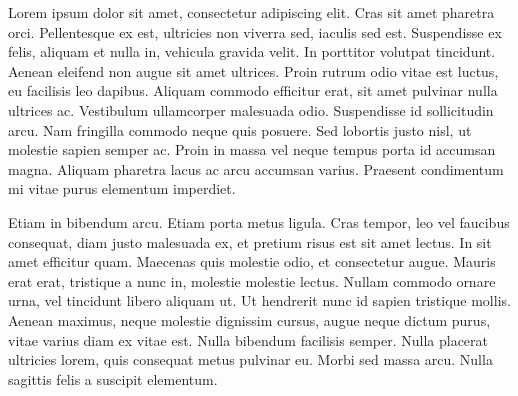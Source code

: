 \documentclass{hitreport}
\begin{document}
Lorem ipsum dolor sit amet, consectetur adipiscing elit. Cras sit amet pharetra orci. Pellentesque ex est, ultricies non viverra sed, iaculis sed est. Suspendisse ex felis, aliquam et nulla in, vehicula gravida velit. In porttitor volutpat tincidunt. Aenean eleifend non augue sit amet ultrices. Proin rutrum odio vitae est luctus, eu facilisis leo dapibus. Aliquam commodo efficitur erat, sit amet pulvinar nulla ultrices ac. Vestibulum ullamcorper malesuada odio. Suspendisse id sollicitudin arcu. Nam fringilla commodo neque quis posuere. Sed lobortis justo nisl, ut molestie sapien semper ac. Proin in massa vel neque tempus porta id accumsan magna. Aliquam pharetra lacus ac arcu accumsan varius. Praesent condimentum mi vitae purus elementum imperdiet.

Etiam in bibendum arcu. Etiam porta metus ligula. Cras tempor, leo vel faucibus consequat, diam justo malesuada ex, et pretium risus est sit amet lectus. In sit amet efficitur quam. Maecenas quis molestie odio, et consectetur augue. Mauris erat erat, tristique a nunc in, molestie molestie lectus. Nullam commodo ornare urna, vel tincidunt libero aliquam ut. Ut hendrerit nunc id sapien tristique mollis. Aenean maximus, neque molestie dignissim cursus, augue neque dictum purus, vitae varius diam ex vitae est. Nulla bibendum facilisis semper. Nulla placerat ultricies lorem, quis consequat metus pulvinar eu. Morbi sed massa arcu. Nulla sagittis felis a suscipit elementum.
\end{document}
